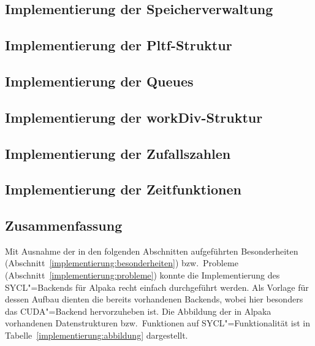 \subsection{Implementierung der Speicherverwaltung}

\subsection{Implementierung der Pltf-Struktur}

\subsection{Implementierung der Queues}

\subsection{Implementierung der workDiv-Struktur}

\subsection{Implementierung der Zufallszahlen}

\subsection{Implementierung der Zeitfunktionen}

\subsection{Zusammenfassung}

Mit Ausnahme der in den folgenden Abschnitten aufgeführten Besonderheiten
(Abschnitt~\ref{implementierung:besonderheiten}) bzw.\ Probleme
(Abschnitt~\ref{implementierung:probleme}) konnte die Implementierung des
SYCL"=Backends für Alpaka recht einfach durchgeführt werden. Als Vorlage für
dessen Aufbau dienten die bereits vorhandenen Backends, wobei hier besonders
das CUDA"=Backend hervorzuheben ist. Die Abbildung der in Alpaka vorhandenen
Datenstrukturen bzw.\ Funktionen auf SYCL"=Funktionalität ist in
Tabelle~\ref{implementierung:abbildung} dargestellt.

